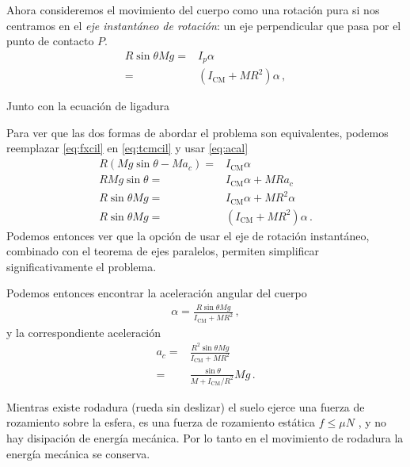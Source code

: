 Ahora consideremos el movimiento del cuerpo como una rotación pura si
nos centramos en el \emph{eje instantáneo de rotación}: un eje
perpendicular que pasa por el punto de contacto $P$.
\begin{align*}
  R\sin\theta M g=&I_p\alpha\nonumber\\
  =&(I_{\text{CM}}+MR^2)\alpha\,,
\end{align*}

Junto con la ecuación de ligadura

Para ver que las dos formas de abordar el problema son equivalentes, podemos reemplazar \eqref{eq:fxcil} en \eqref{eq:tcmcil} y usar \eqref{eq:acal} 
\begin{align*}
  R(Mg\sin\theta-M a_c)=&I_{\text{CM}}\alpha\nonumber\\
  RMg\sin\theta=&I_{\text{CM}}\alpha+M R a_c\nonumber\\
  R\sin\theta Mg=&I_{\text{CM}}\alpha+M R^2\alpha\nonumber\\
  R\sin\theta Mg=&(I_{\text{CM}}+M R^2)\alpha\,.
\end{align*}
Podemos entonces ver que la opción de usar el eje de rotación instantáneo, combinado con el teorema de ejes paralelos, permiten simplificar significativamente el problema.

Podemos entonces encontrar la aceleración angular del cuerpo
\begin{align}
  \alpha=\frac{R\sin\theta M g}{I_{\text{CM}}+MR^2}\,,
\end{align}
y la correspondiente aceleración
\begin{align}
  \label{eq:acelcil}
  a_c=&\frac{R^2\sin\theta M g}{I_{\text{CM}}+MR^2}\nonumber\\
  =&\frac{\sin\theta }{M+I_{\text{CM}}/R^2}M g\,.
\end{align}


Mientras existe rodadura (rueda sin deslizar) el suelo ejerce una
fuerza de rozamiento sobre la esfera, es una fuerza de rozamiento
estática $f \le\mu N$ , y no hay disipación de energía mecánica. 
Por lo tanto en el movimiento de rodadura la energía mecánica se
conserva.

